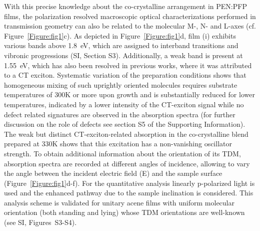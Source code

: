 \documentclass[journal=jpclcd,manuscript=letter]{achemso}
\begin{document}
With this precise knowledge about the co-crystalline arrangement in PEN:PFP films, the polarization resolved macroscopic optical characterizations performed in transmission geometry can also be related to the molecular M-, N- and L-axes (cf. Figure~\ref{Figure:fig1}c). As depicted in Figure~\ref{Figure:fig1}d, film (i) exhibits various bands above 1.8~eV, which are assigned to interband transitions
and vibronic progressions (SI, Section S3). Additionally, a weak band is present at 1.55~eV, which has also been resolved in previous works, where it was attributed to a CT exciton.
\cite{broc+11prb,ange+12jcp, breu-witt13jcp} Systematic variation of the preparation conditions shows that homogeneous mixing of such uprightly oriented molecules requires substrate temperatures of 300K or more upon growth and is substantially reduced for lower temperatures, indicated by a lower intensity of the CT-exciton signal while no defect related signatures are observed in the absorption spectra (for further discussion on the role of defects see section S5 of the Supporting Information). The weak but distinct CT-exciton-related absorption in the co-crystalline blend prepared at 330K shows that this excitation has a non-vanishing oscillator strength. To obtain additional information about the orientation of its TDM, absorption spectra are recorded at different angles of incidence, allowing to vary the angle between the incident electric field (E) and the sample surface (Figure~\ref{Figure:fig1}d-f). For the quantitative analysis linearly p-polarized light is used and the enhanced pathway due to the sample inclination is considered. This analysis scheme is validated for unitary acene films with uniform molecular orientation (both standing and lying) whose TDM orientations are well-known (see SI, Figures~S3-S4). 
\end{document}
